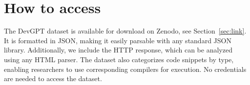 \documentclass[10pt,conference]{IEEEtran}
\begin{document}
\section{How to access}

The DevGPT dataset is available for download on Zenodo, see Section~\ref{sec:link}. It is formatted in JSON, making it easily parsable with any standard JSON library. Additionally, we include the HTTP response, which can be analyzed using any HTML parser. The dataset also categorizes code snippets by type, enabling researchers to use corresponding compilers for execution. No credentials are needed to access the dataset.
\end{document}
